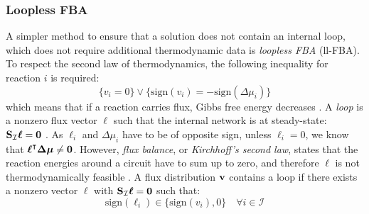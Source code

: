 \subsubsection{Loopless FBA} \label{section:ll_fba}
A simpler method to ensure that a solution does not contain an internal loop, which does not require additional thermodynamic data is \textit{loopless FBA} (ll-FBA). 
To respect the second law of thermodynamics, the following inequality for reaction $i$ is required: 
\begin{equation}
    \{v_i = 0\} \lor \{\text{sign}(v_i) = - \text{sign}(\Delta \mu_i)\} 
\end{equation}
\quad which means that if a reaction carries flux, Gibbs free energy decreases \cite{muller_fast_2013}. 
A \textit{loop} is a nonzero flux vector $\boldsymbol \ell$ such that the internal network is at steady-state: $\bold S_{\mathcal{I}} \boldsymbol \ell = \bold 0$ \cite{noor_proof_2012}. As $\ell_i$ and $\Delta \mu_i$ have to be of opposite sign, unless $\ell_i=0$, we know that $\boldsymbol \ell^\intercal \boldsymbol{\Delta \mu} \neq \bold 0$. %
However, \textit{flux balance}, or \textit{Kirchhoff's second law}, states that the reaction energies around a circuit have to sum up to zero, and therefore $\boldsymbol \ell$ is not thermodynamically feasible \cite{elimination_infeasible_loops}. 
A flux distribution $\bold v$ contains a loop if there exists a nonzero vector $\boldsymbol \ell$ with $\bold S_{\mathcal{I}} \boldsymbol \ell = \bold 0$ such that: %
\begin{equation*}
    \text{sign}(\ell_i) \in \{\text{sign}(v_i),0\} \quad \forall i \in \mathcal{I}
\end{equation*}

